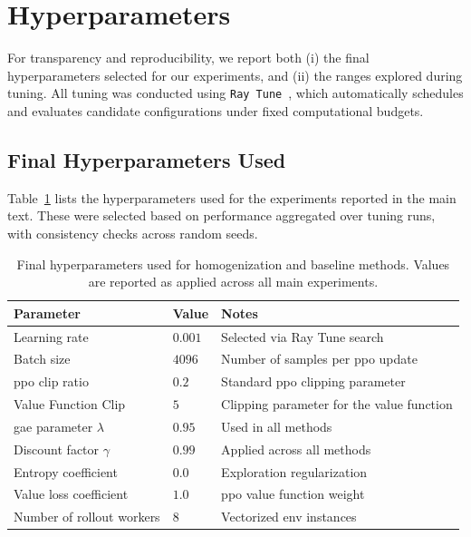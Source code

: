 
\section{Hyperparameters}
\label{con2:app:hyperparameters}

For transparency and reproducibility, we report both 
(i) the final hyperparameters selected for our experiments, and 
(ii) the ranges explored during tuning. 
All tuning was conducted using \texttt{Ray Tune}~\cite{liaw2018}, 
which automatically schedules and evaluates candidate configurations under 
fixed computational budgets.

\subsection{Final Hyperparameters Used}
Table~\ref{tab:final-hparams} lists the hyperparameters used for the 
experiments reported in the main text. These were selected based on performance 
aggregated over tuning runs, with consistency checks across random seeds.

\begin{table}[H]
    \centering
    \caption[Final Hyperparameters use for Implicit Indication Experiments]{
        Final hyperparameters used for homogenization and baseline methods. 
        Values are reported as applied across all main experiments.
    }
    \label{tab:final-hparams}
    \begin{tabular}{l l l}
        \toprule
        \textbf{Parameter} & \textbf{Value} & \textbf{Notes} \\
        \midrule
        Learning rate & \(0.001\) & Selected via Ray Tune search \\
        Batch size & \(4096\) & Number of samples per \gls{ppo} update \\
        \gls{ppo} clip ratio & \(0.2\) & Standard \gls{ppo} clipping parameter \\
        Value Function Clip & \(5\) & Clipping parameter for the value function \\
        \gls{gae} parameter $\lambda$ & \(0.95\) & Used in all methods \\
        Discount factor $\gamma$ & \(0.99\) & Applied across all methods \\
        Entropy coefficient & \(0.0\) & Exploration regularization \\
        Value loss coefficient & \(1.0\) & \gls{ppo} value function weight \\
        Number of rollout workers & \(8\) & Vectorized env instances \\
        \bottomrule
    \end{tabular}
\end{table}

